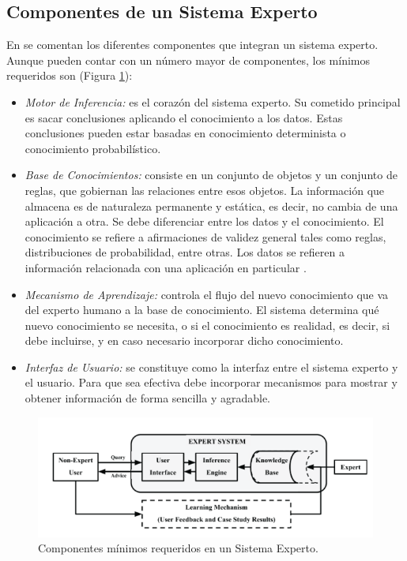 \subsection{Componentes de un Sistema Experto}
En \cite{OdhiamboOmuya2021} se comentan los diferentes componentes que integran un sistema experto. Aunque pueden contar con un número mayor de componentes, los mínimos requeridos son (Figura \ref{fig:componentesSE}):

\begin{itemize}
\item \textsl{Motor de Inferencia:} es el corazón del sistema experto. Su cometido principal es sacar conclusiones aplicando el conocimiento a los datos. Estas conclusiones pueden estar basadas en conocimiento determinista o conocimiento probabilístico.
\item \textsl{Base de Conocimientos:} consiste en un conjunto de objetos y un conjunto de reglas, que gobiernan las relaciones entre esos objetos. La información que almacena es de naturaleza permanente y estática, es
decir, no cambia de una aplicación a otra. Se debe diferenciar entre los datos y
el conocimiento. El conocimiento se refiere a afirmaciones de validez general tales como reglas, distribuciones de probabilidad, entre otras. Los datos se refieren a información relacionada con una aplicación en particular \cite{Potapova2021}.
\item \textsl{Mecanismo de Aprendizaje:} controla el flujo del nuevo conocimiento que va del experto humano a la base de conocimiento. El sistema determina qué nuevo conocimiento se necesita, o si el conocimiento es realidad, es decir, si debe incluirse, y en caso necesario incorporar dicho
conocimiento.
\item \textsl{Interfaz de Usuario:} se constituye como la interfaz entre el sistema experto y el usuario. Para que sea efectiva debe incorporar mecanismos para mostrar y obtener información de forma sencilla y agradable.
\end{itemize}

\begin{figure}[h]
\centering
 \includegraphics[width=0.5\linewidth]{imagen/ComponentesSE.png}
 \caption{Componentes mínimos requeridos en un Sistema Experto.}
 \label{fig:componentesSE} 
\end{figure}


